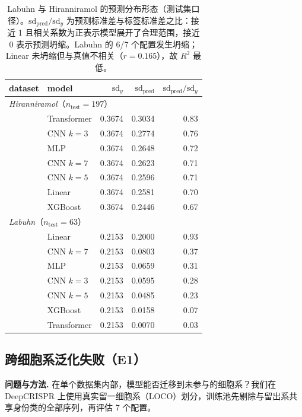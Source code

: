 \begin{table}[htbp]
\centering
\scriptsize
\caption{Labuhn 与 Hiranniramol 的预测分布形态（测试集口径）。$\mathrm{sd}_{\text{pred}}/\mathrm{sd}_{y}$ 为预测标准差与标签标准差之比：接近 1 且相关系数为正表示模型展开了合理范围，接近 0 表示预测坍缩。Labuhn 的 6/7 个配置发生坍缩；Linear 未坍缩但与真值不相关（$r=0.165$），故 $R^{2}$ 最低。}
\label{tab:collapse}
\begin{tabular}{llrrr}
\toprule
dataset & model & $\mathrm{sd}_{y}$ & $\mathrm{sd}_{\text{pred}}$ & $\mathrm{sd}_{\text{pred}}/\mathrm{sd}_{y}$ \\
\midrule
\multicolumn{5}{l}{\textit{Hiranniramol}（$n_{\text{test}}=197$）} \\
 & Transformer & 0.3674 & 0.3034 & 0.83 \\
 & CNN $k{=}3$ & 0.3674 & 0.2774 & 0.76 \\
 & MLP & 0.3674 & 0.2648 & 0.72 \\
 & CNN $k{=}7$ & 0.3674 & 0.2623 & 0.71 \\
 & CNN $k{=}5$ & 0.3674 & 0.2596 & 0.71 \\
 & Linear & 0.3674 & 0.2581 & 0.70 \\
 & XGBoost & 0.3674 & 0.2446 & 0.67 \\
\midrule
\multicolumn{5}{l}{\textit{Labuhn}（$n_{\text{test}}=63$）} \\
 & Linear & 0.2153 & 0.2000 & 0.93 \\
 & CNN $k{=}7$ & 0.2153 & 0.0803 & 0.37 \\
 & MLP & 0.2153 & 0.0659 & 0.31 \\
 & CNN $k{=}3$ & 0.2153 & 0.0595 & 0.28 \\
 & CNN $k{=}5$ & 0.2153 & 0.0485 & 0.23 \\
 & XGBoost & 0.2153 & 0.0158 & 0.07 \\
 & Transformer & 0.2153 & 0.0070 & 0.03 \\
\bottomrule
\end{tabular}
\end{table}



\subsection{跨细胞系泛化失败（E1）}
\label{sec:res-loco}

\textbf{问题与方法.} 在单个数据集内部，模型能否迁移到未参与的细胞系？我们在 DeepCRISPR 上使用真实留一细胞系（LOCO）划分，训练池先剔除与留出系共享身份类的全部序列，再评估 7 个配置。

